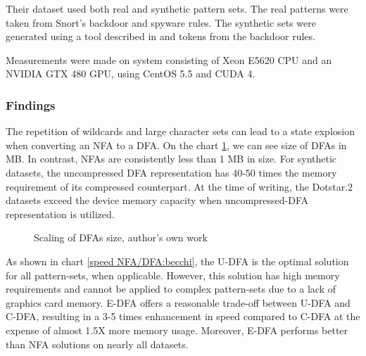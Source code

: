 \documentclass[10pt,onecolumn,twoside,english,a4paper]{article}
\begin{document}
Their dataset used both real and synthetic pattern sets. The real patterns were taken from Snort's backdoor and spyware rules. The synthetic sets were generated using a tool described in \cite{becchi2008workload} and tokens from the backdoor rules.

Measurements were made on system consisting of Xeon E5620 CPU and an NVIDIA  GTX 480 GPU, using CentOS 5.5 and CUDA 4.
\subsubsection{Findings}
The repetition of wildcards and large character sets can lead to a state explosion when converting an NFA to a DFA. On the chart \ref{dfas_size:becchi}, we can see size of DFAs in MB. In contrast, NFAs are consistently less than 1 MB in size. For synthetic datasets, the uncompressed DFA representation has 40-50 times the memory requirement of its compressed counterpart. At the time of writing, the Dotstar.2 datasets exceed the device memory capacity when uncompressed-DFA representation is utilized.
\begin{figure}[h!]
	\centering
	\caption{Scaling of DFAs size, author's own work}
	\label{dfas_size:becchi}
\end{figure}

As shown in chart \ref{speed NFA/DFA:becchi}, the U-DFA is the optimal solution for all pattern-sets, when applicable. However, this solution has high memory requirements and cannot be applied to complex pattern-sets due to a lack of graphics card memory.
E-DFA offers a reasonable trade-off between U-DFA and C-DFA, resulting in a 3-5 times enhancement in speed compared to C-DFA at the expense of almost 1.5X more memory usage. Moreover, E-DFA performs better than NFA solutions on nearly all datasets.
\end{document}

